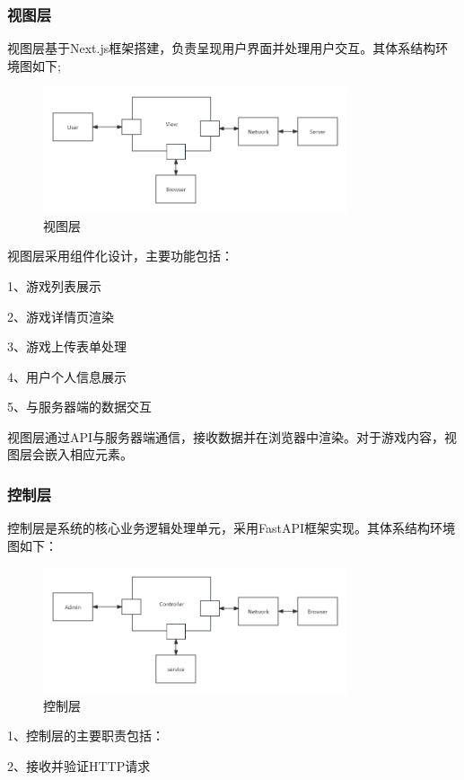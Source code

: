 \documentclass[12pt]{ctexart} %
\begin{document}
\subsubsection{视图层}
视图层基于Next.js框架搭建，负责呈现用户界面并处理用户交互。其体系结构环境图如下;

\begin{figure}[htbp]
  \centering 
  \includegraphics[width=0.8\textwidth]{view.png}
  \caption{视图层}
\end{figure}

视图层采用组件化设计，主要功能包括：

1、游戏列表展示

2、游戏详情页渲染

3、游戏上传表单处理

4、用户个人信息展示

5、与服务器端的数据交互

视图层通过API与服务器端通信，接收数据并在浏览器中渲染。对于游戏内容，视图层会嵌入相应元素。
\subsubsection{控制层}
控制层是系统的核心业务逻辑处理单元，采用FastAPI框架实现。其体系结构环境图如下：

\begin{figure}[htbp]
  \centering 
  \includegraphics[width=0.8\textwidth]{control.png}
  \caption{控制层}
\end{figure}

1、控制层的主要职责包括：

2、接收并验证HTTP请求
\end{document}
